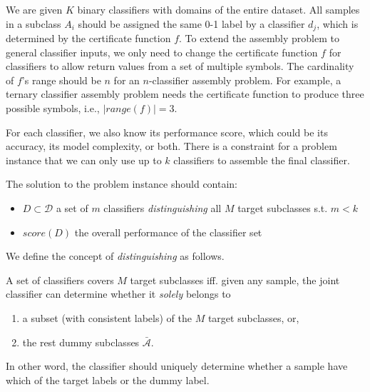 \documentclass[sigplan,10pt,review]{acmart}\settopmatter{printfolios=true,printccs=false,printacmref=false}
\begin{document}
We are given $K$ binary classifiers with domains of the entire dataset.
All samples in a subclass $A_i$ should be assigned the same 0-1 label by a classifier $d_j$, which is determined by the certificate function $f$.
To extend the assembly problem to general classifier inputs, we only need to change the certificate function $f$ for classifiers to allow return values from a set of multiple symbols.
The cardinality of $f$'s range should be $n$ for an $n$-classifier assembly problem.
For example, a ternary classifier assembly problem needs the certificate function to produce three possible symbols, i.e., $|range(f)| = 3$.

For each classifier, we also know its performance score, which could be its accuracy, its model complexity, or both.
There is a constraint for a problem instance that we can only use up to $k$ classifiers to assemble the final classifier.

The solution to the problem instance should contain:
\begin{itemize}
	\item $D \subset \mathcal{D}$ a set of $m$ classifiers \textit{distinguishing} all $M$ target subclasses s.t. $m < k$
	\item $score(D)$ the overall performance of the classifier set
\end{itemize}


We define the concept of \textit{distinguishing} as follows.
\begin{definition}
	A set of classifiers covers $M$ target subclasses iff. given any sample, the joint classifier can determine whether it \textit{solely} belongs to \begin{enumerate}
		\item a subset (with consistent labels) of the $M$ target subclasses, or,
		\item the rest dummy subclasses $\bar{\mathcal{A}}$.
	\end{enumerate}
\end{definition}
In other word, the classifier should uniquely determine whether a sample have which of the target labels or the dummy label.
\end{document}
